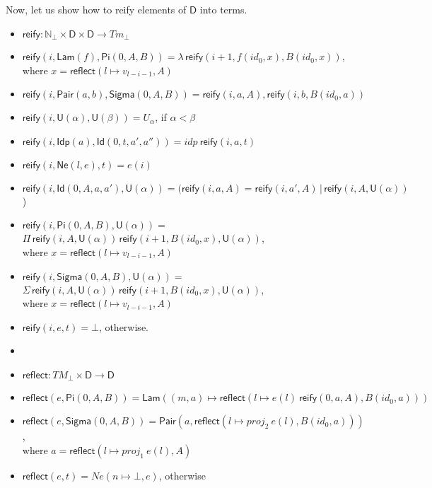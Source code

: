 \documentclass{amsart}
\theoremstyle{definition}
\theoremstyle{remark}
\newcommand{\D}{\mathsf{D}}
\newcommand{\nats}{\mathbb{N}}
\numberwithin{table}{section}
\begin{document}
Now, let us show how to reify elements of $\D$ into terms.
\begin{itemize}
\item[] $\mathsf{reify} : \nats_\bot \times \D \times \D \to Tm_\bot$
\item[] $\mathsf{reify}(i, \mathsf{Lam}(f), \mathsf{Pi}(0, A, B)) = \lambda\,\mathsf{reify}(i + 1, f(id_0, x), B(id_0, x))$, \\
        \indent where $x = \mathsf{reflect}(l \mapsto v_{l - i - 1}, A)$
\item[] $\mathsf{reify}(i, \mathsf{Pair}(a, b), \mathsf{Sigma}(0, A, B)) = \mathsf{reify}(i, a, A), \mathsf{reify}(i, b, B(id_0, a))$
\item[] $\mathsf{reify}(i, \mathsf{U}(\alpha), \mathsf{U}(\beta)) = U_\alpha$, if $\alpha < \beta$
\item[] $\mathsf{reify}(i, \mathsf{Idp}(a), \mathsf{Id}(0, t, a', a'')) = idp\ \mathsf{reify}(i, a, t)$
\item[] $\mathsf{reify}(i, \mathsf{Ne}(l, e), t) = e(i)$
\item[] $\mathsf{reify}(i, \mathsf{Id}(0, A, a, a'), \mathsf{U}(\alpha)) = (\mathsf{reify}(i, a, A) = \mathsf{reify}(i, a', A)\,|\,\mathsf{reify}(i, A, \mathsf{U}(\alpha))$)
\item[] $\mathsf{reify}(i, \mathsf{Pi}(0, A, B), \mathsf{U}(\alpha)) =$
        $\Pi\,\mathsf{reify}(i, A, \mathsf{U}(\alpha))\,\mathsf{reify}(i + 1, B(id_0, x), \mathsf{U}(\alpha))$, \\
        \indent where $x = \mathsf{reflect}(l \mapsto v_{l - i - 1}, A)$
\item[] $\mathsf{reify}(i, \mathsf{Sigma}(0, A, B), \mathsf{U}(\alpha)) = $
        $\Sigma\,\mathsf{reify}(i, A, \mathsf{U}(\alpha))\,\mathsf{reify}(i + 1, B(id_0, x), \mathsf{U}(\alpha))$, \\
        \indent where $x = \mathsf{reflect}(l \mapsto v_{l - i - 1}, A)$
\item[] $\mathsf{reify}(i, e, t) = \bot$, otherwise.
\item[]
\item[] $\mathsf{reflect} : TM_\bot \times \D \to \D$
\item[] $\mathsf{reflect}(e,\mathsf{Pi}(0, A, B)) = \mathsf{Lam}((m, a) \mapsto \mathsf{reflect}(l \mapsto e(l)\ \mathsf{reify}(0, a, A), B(id_0, a)))$
\item[] $\mathsf{reflect}(e,\mathsf{Sigma}(0, A, B)) = \mathsf{Pair}(a, \mathsf{reflect}(l \mapsto proj_2\ e(l), B(id_0, a)))$, \\
        \indent where $a = \mathsf{reflect}(l \mapsto proj_1\ e(l), A)$
\item[] $\mathsf{reflect}(e,t) = Ne(n \mapsto \bot, e)$, otherwise
\end{itemize}



\end{document}
